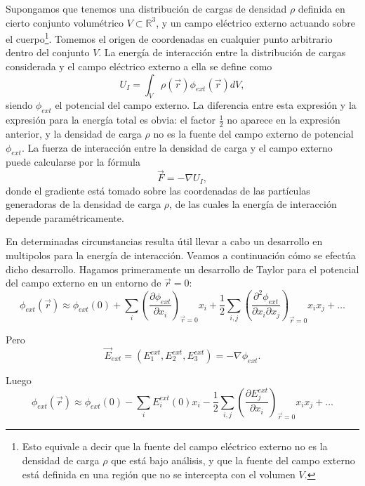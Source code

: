 \documentclass[12pt,a4paper]{book}
\begin{document}
Supongamos que tenemos una distribución de cargas de densidad $\rho$ definida en cierto conjunto volumétrico $V \subset \mathbb{R}^3$, y un campo eléctrico externo actuando sobre el cuerpo\footnote{Esto equivale a decir que la fuente del campo eléctrico externo no es la densidad de carga $\rho$ que está bajo análisis, y que la fuente del campo externo está definida en una región que no se intercepta con el volumen $V$.}. Tomemos el origen de coordenadas en cualquier punto arbitrario dentro del conjunto $V$. La energía de interacción entre la distribución de cargas considerada y el campo eléctrico externo a ella se define como
\begin{equation}
U_I = \int_V \rho(\vec{r})\phi_{ext}(\vec{r})dV,
\end{equation}
siendo $\phi_{ext}$ el potencial del campo externo. La diferencia entre esta expresión y la expresión para la energía total es obvia: el factor $\frac{1}{2}$ no aparece en la expresión anterior, y la densidad de carga $\rho$ no es la fuente del campo externo de potencial $\phi_{ext}$. La fuerza de interacción entre la densidad de carga y el campo externo puede calcularse por la fórmula
\begin{equation}
\vec{F} = -\nabla U_I,
\end{equation}
donde el gradiente está tomado sobre las coordenadas de las partículas generadoras de la densidad de carga $\rho$, de las cuales la energía de interacción depende paramétricamente.

En determinadas circunstancias resulta útil llevar a cabo un desarrollo en multipolos para la energía de interacción. Veamos a continuación cómo se efectúa dicho desarrollo. Hagamos primeramente un desarrollo de Taylor para el potencial del campo externo en un entorno de $\vec{r} = 0$:
\begin{equation}
\phi_{ext}(\vec{r}) \approx \phi_{ext}(0) + \sum_i \left(\frac{\partial\phi_{ext}}{\partial x_i}\right)_{\vec{r}=0} x_i + \frac{1}{2}\sum_{i,j} \left(\frac{\partial^2\phi_{ext}}{\partial x_i \partial x_j}\right)_{\vec{r}=0} x_i x_j + \ldots
\end{equation}

Pero
\begin{equation}
\vec{E}_{ext} = (E^{ext}_1, E^{ext}_2, E^{ext}_3) = -\nabla\phi_{ext}.
\end{equation}

Luego
\begin{equation}
\phi_{ext}(\vec{r}) \approx \phi_{ext}(0) - \sum_i E^{ext}_i(0)x_i - \frac{1}{2}\sum_{i,j} \left(\frac{\partial E^{ext}_j}{\partial x_i}\right)_{\vec{r}=0} x_i x_j + \ldots
\end{equation}
\end{document}
